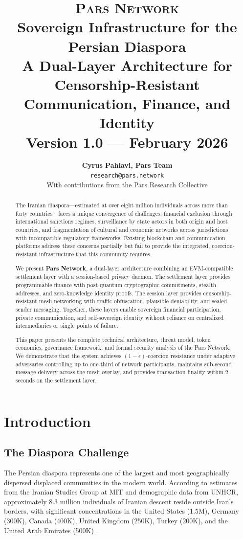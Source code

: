 \documentclass[11pt,a4paper,twocolumn]{article}
\title{
  \vspace{-1cm}
  {\Large\textsc{Pars Network}}\\[0.3cm]
  {\LARGE\textbf{Sovereign Infrastructure for the Persian Diaspora}}\\[0.5cm]
  {\large A Dual-Layer Architecture for Censorship-Resistant\\Communication, Finance, and Identity}\\[0.3cm]
  {\normalsize Version 1.0 --- February 2026}
}
\author{
  \textbf{Cyrus Pahlavi, Pars Team}\\
  \texttt{research@pars.network}\\[0.2cm]
  \small With contributions from the Pars Research Collective
}
\date{}
\begin{document}
\parscoverpage


\begin{abstract}
The Iranian diaspora---estimated at over eight million individuals across more than forty countries---faces a unique convergence of challenges: financial exclusion through international sanctions regimes, surveillance by state actors in both origin and host countries, and fragmentation of cultural and economic networks across jurisdictions with incompatible regulatory frameworks. Existing blockchain and communication platforms address these concerns partially but fail to provide the integrated, coercion-resistant infrastructure that this community requires.

We present \textbf{Pars Network}, a dual-layer architecture combining an EVM-compatible settlement layer with a session-based privacy daemon. The settlement layer provides programmable finance with post-quantum cryptographic commitments, stealth addresses, and zero-knowledge identity proofs. The session layer provides censorship-resistant mesh networking with traffic obfuscation, plausible deniability, and sealed-sender messaging. Together, these layers enable sovereign financial participation, private communication, and self-sovereign identity without reliance on centralized intermediaries or single points of failure.

This paper presents the complete technical architecture, threat model, token economics, governance framework, and formal security analysis of the Pars Network. We demonstrate that the system achieves $(1-\epsilon)$-coercion resistance under adaptive adversaries controlling up to one-third of network participants, maintains sub-second message delivery across the mesh overlay, and provides transaction finality within 2 seconds on the settlement layer.
\end{abstract}

\section{Introduction}
\label{sec:introduction}

\subsection{The Diaspora Challenge}

The Persian diaspora represents one of the largest and most geographically dispersed displaced communities in the modern world. According to estimates from the Iranian Studies Group at MIT and demographic data from UNHCR, approximately 8.3 million individuals of Iranian descent reside outside Iran's borders, with significant concentrations in the United States (1.5M), Germany (300K), Canada (400K), United Kingdom (250K), Turkey (200K), and the United Arab Emirates (500K) \cite{hakimzadeh2006iran,modarres2018diaspora}.
\end{document}
